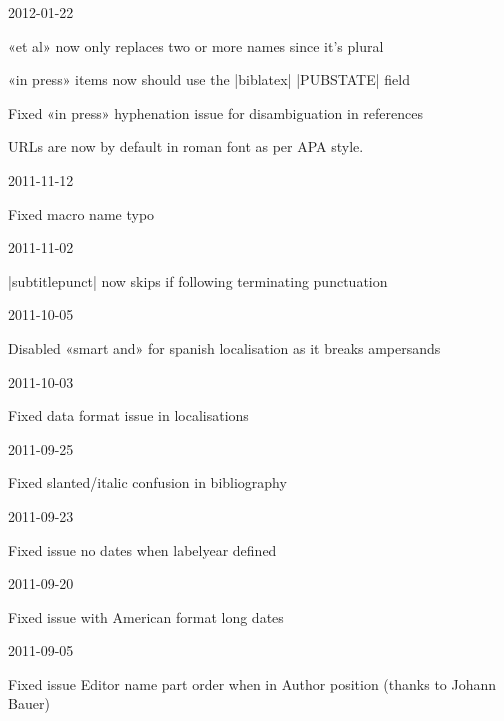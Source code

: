 \documentclass{ltxdockit}
\begin{document}
\begin{changelog}
\begin{release}{4.3}{2012-01-22}
\item «et al» now only replaces two or more names since it's plural
\item «in press» items now should use the |biblatex| |PUBSTATE| field
\item Fixed «in press» hyphenation issue for disambiguation in references
\item URLs are now by default in roman font as per APA style.
\end{release}

\begin{release}{4.2}{2011-11-12}
\item Fixed macro name typo
\end{release}

\begin{release}{4.1}{2011-11-02}
\item |subtitlepunct| now skips if following terminating punctuation
\end{release}

\begin{release}{4.0}{2011-10-05}
\item Disabled «smart and» for spanish localisation as it breaks ampersands
\end{release}

\begin{release}{3.9}{2011-10-03}
\item Fixed data format issue in localisations
\end{release}

\begin{release}{3.8}{2011-09-25}
\item Fixed slanted/italic confusion in bibliography
\end{release}

\begin{release}{3.7}{2011-09-23}
\item Fixed issue no dates when labelyear defined
\end{release}

\begin{release}{3.6}{2011-09-20}
\item Fixed issue with American format long dates
\end{release}

\begin{release}{3.5}{2011-09-05}
\item Fixed issue Editor name part order when in Author position (thanks to
  Johann Bauer)
\end{release}


\end{changelog}
\end{document}
